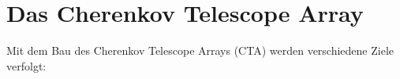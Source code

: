 \chapter{Das Cherenkov Telescope Array}
Mit dem Bau des Cherenkov Telescope Arrays (CTA) werden verschiedene Ziele verfolgt: